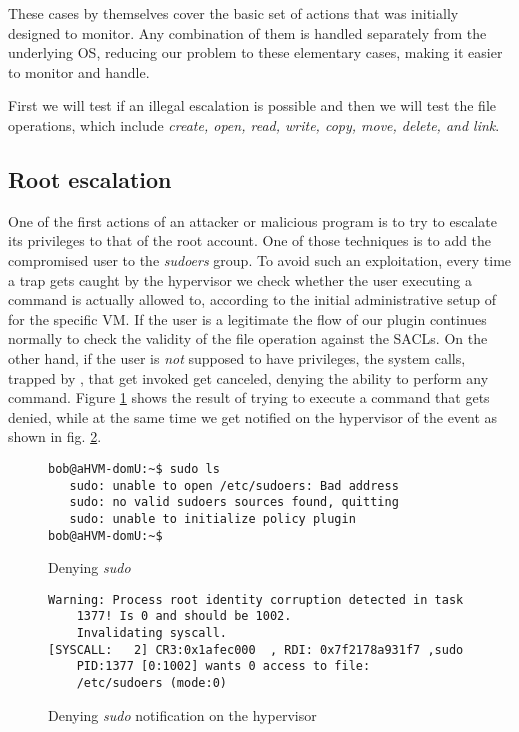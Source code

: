 \par These cases by themselves cover the basic set of actions that  was initially designed to monitor. Any combination of them is handled separately from the underlying \ac{OS}, reducing our problem to these elementary cases, making it easier to monitor and handle.

\par First we will test if an illegal  escalation is possible and then we will test the file operations, which include \emph{create, open, read, write, copy, move, delete, and link}.

\subsection{Root escalation}

\par One of the first actions of an attacker or malicious program is to try to escalate its privileges to that of the root account. One of those techniques is to add the compromised user to the \emph{sudoers} group. To avoid such an exploitation, every time a trap gets caught by the hypervisor we check whether the user executing a  command is actually allowed to, according to the initial administrative setup of  for the specific \ac{VM}. If the user is a legitimate  the flow of our plugin continues normally to check the validity of the file operation against the \acp{SACL}. On the other hand, if the user is \emph{not} supposed to have  privileges, the system calls, trapped by , that get invoked get canceled, denying the ability to perform any  command. Figure \ref{fig:sudo_deny} shows the result of trying to execute a  command that gets denied, while at the same time we get notified on the hypervisor of the event as shown in fig. \ref{fig:sudo_deny_not}.

\begin{figure}[ht]
	\centering
	\footnotesize{\selectfont 
		\begin{lstlisting}
bob@aHVM-domU:~$ sudo ls
   sudo: unable to open /etc/sudoers: Bad address
   sudo: no valid sudoers sources found, quitting
   sudo: unable to initialize policy plugin
bob@aHVM-domU:~$
		\end{lstlisting}}
	\caption{Denying \emph{sudo}}
	\label{fig:sudo_deny}
\end{figure}

\begin{figure}[ht]
	\centering
	\footnotesize{\selectfont 
		\begin{lstlisting}
Warning: Process root identity corruption detected in task 
	1377! Is 0 and should be 1002. 
	Invalidating syscall.
[SYSCALL:   2] CR3:0x1afec000  , RDI: 0x7f2178a931f7 ,sudo 
	PID:1377 [0:1002] wants 0 access to file: 
	/etc/sudoers (mode:0)
		\end{lstlisting}}
	\caption{Denying \emph{sudo} notification on the hypervisor}
	\label{fig:sudo_deny_not}
\end{figure}

